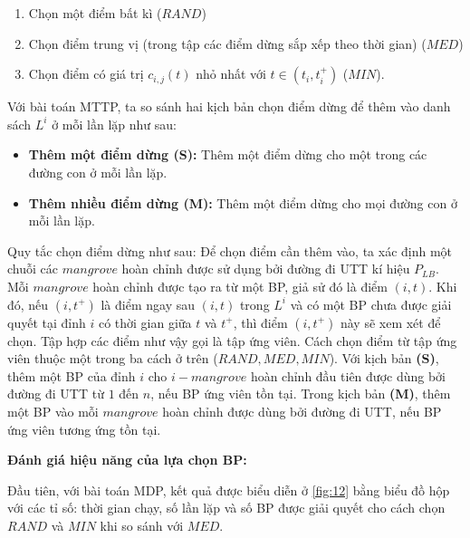 \documentclass[../main.tex]{subfiles}
\begin{document}
\begin{enumerate}
\def\labelenumi{\arabic{enumi}.}
\tightlist
\item
  Chọn một điểm bất kì (\(RAND\))
\item
  Chọn điểm trung vị (trong tập các điểm dừng sắp xếp theo thời gian)
  (\(MED\))
\item
  Chọn điểm có giá trị \(c_{i, j}(t)\) nhỏ nhất với
  \(t\in (t_i, t_i^+)\) (\(MIN\)).
\end{enumerate}

Với bài toán MTTP, ta so sánh hai kịch bản chọn điểm dừng để thêm vào
danh sách \(L^i\) ở mỗi lần lặp như sau:

\begin{itemize}
\tightlist
\item
  \textbf{Thêm một điểm dừng (S):} Thêm một điểm dừng cho một trong các
  đường con ở mỗi lần lặp.
\item
  \textbf{Thêm nhiều điểm dừng (M):} Thêm một điểm dừng cho mọi đường
  con ở mỗi lần lặp.
\end{itemize}

Quy tắc chọn điểm dừng như sau: Để chọn điểm cần thêm vào, ta xác định
một chuỗi các \(mangrove\) hoàn chỉnh được sử dụng bởi đường đi UTT kí
hiệu \(P_{LB}\). Mỗi \(mangrove\) hoàn chỉnh được tạo ra từ một BP, giả
sử đó là điểm \((i,t)\). Khi đó, nếu \((i,t^+)\) là điểm ngay sau
\((i,t)\) trong \(L^i\) và có một BP chưa được giải quyết tại đỉnh \(i\)
có thời gian giữa \(t\) và \(t^+\), thì điểm \((i,t^+)\) này sẽ xem xét
để chọn. Tập hợp các điểm như vậy gọi là tập ứng viên. Cách chọn điểm từ
tập ứng viên thuộc một trong ba cách ở trên (\(RAND, MED, MIN\)). Với
kịch bản \textbf{(S)}, thêm một BP của đỉnh \(i\) cho \(i-mangrove\)
hoàn chỉnh đầu tiên được dùng bởi đường đi UTT từ \(1\) đến \(n\), nếu
BP ứng viên tồn tại. Trong kịch bản \textbf{(M)}, thêm một BP vào mỗi
\(mangrove\) hoàn chỉnh được dùng bởi đường đi UTT, nếu BP ứng viên
tương ứng tồn tại.

\textbf{Đánh giá hiệu năng của lựa chọn BP:}

Đầu tiên, với bài toán MDP, kết quả được biểu diễn ở \autoref{fig:12} bằng biểu
đồ hộp với các tỉ số: thời gian chạy, số lần lặp và số BP được giải
quyết cho cách chọn \(RAND\) và \(MIN\) khi so sánh với \(MED\).
\end{document}
